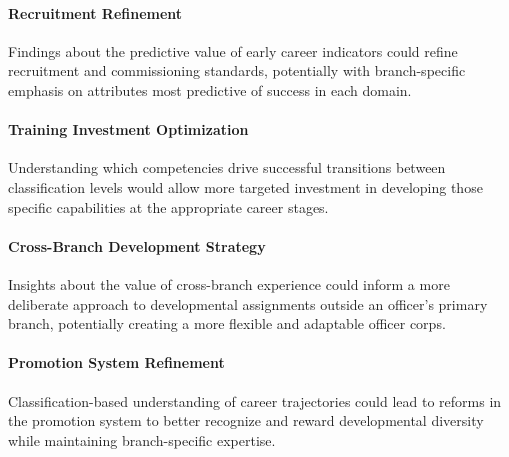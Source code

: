 \documentclass[../main.tex]{subfiles}
\begin{document}
\paragraph{Recruitment Refinement} Findings about the predictive value of early career indicators could refine recruitment and commissioning standards, potentially with branch-specific emphasis on attributes most predictive of success in each domain.

\paragraph{Training Investment Optimization} Understanding which competencies drive successful transitions between classification levels would allow more targeted investment in developing those specific capabilities at the appropriate career stages.

\paragraph{Cross-Branch Development Strategy} Insights about the value of cross-branch experience could inform a more deliberate approach to developmental assignments outside an officer's primary branch, potentially creating a more flexible and adaptable officer corps.

\paragraph{Promotion System Refinement} Classification-based understanding of career trajectories could lead to reforms in the promotion system to better recognize and reward developmental diversity while maintaining branch-specific expertise.



\end{document}
